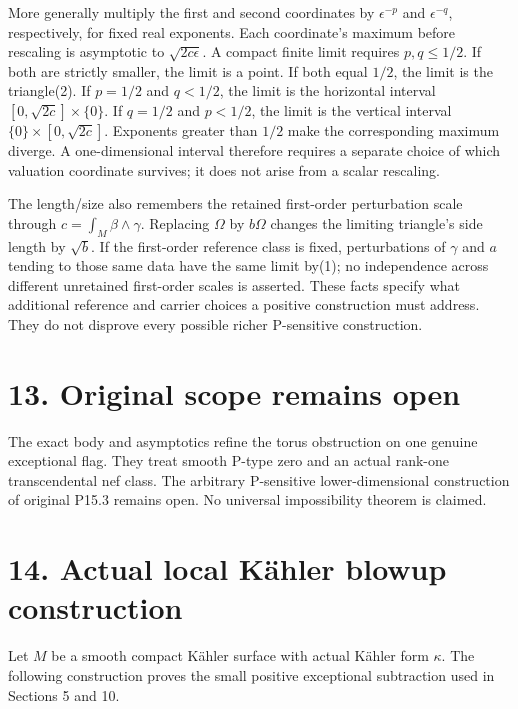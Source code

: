 \documentclass[11pt]{article}
\begin{document}
More generally multiply the first and second coordinates by $\epsilon^{-p}$ and $\epsilon^{-q}$, respectively, for fixed real exponents. Each coordinate's maximum before rescaling is asymptotic to $\sqrt{2c\epsilon}$. A compact finite limit requires $p,q\leq1/2$. If both are strictly smaller, the limit is a point. If both equal $1/2$, the limit is the triangle(2). If $p=1/2$ and $q<1/2$, the limit is the horizontal interval $[0,\sqrt{2c}]\times\{0\}$. If $q=1/2$ and $p<1/2$, the limit is the vertical interval $\{0\}\times[0,\sqrt{2c}]$. Exponents greater than $1/2$ make the corresponding maximum diverge. A one-\allowbreak{}dimensional interval therefore requires a separate choice of which valuation coordinate survives; it does not arise from a scalar rescaling.

The length/\allowbreak{}size also remembers the retained first-\allowbreak{}order perturbation scale through $c=\int_M\beta\wedge\gamma$. Replacing $\Omega$ by $b\Omega$ changes the limiting triangle's side length by $\sqrt b$. If the first-\allowbreak{}order reference class is fixed, perturbations of $\gamma$ and $a$ tending to those same data have the same limit by(1); no independence across different unretained first-\allowbreak{}order scales is asserted. These facts specify what additional reference and carrier choices a positive construction must address. They do not disprove every possible richer P-\allowbreak{}sensitive construction.

\section*{13. Original scope remains open}

The exact body and asymptotics refine the torus obstruction on one genuine exceptional flag. They treat smooth P-\allowbreak{}type zero and an actual rank-\allowbreak{}one transcendental nef class. The arbitrary P-\allowbreak{}sensitive lower-\allowbreak{}dimensional construction of original P15.3 remains open. No universal impossibility theorem is claimed.

\section*{14. Actual local Kähler blowup construction}

Let $M$ be a smooth compact Kähler surface with actual Kähler form $\kappa$. The following construction proves the small positive exceptional subtraction used in Sections 5 and 10.
\end{document}
